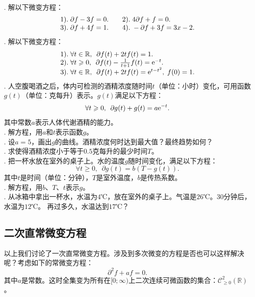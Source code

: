 \documentclass[12pt,UTF8,fontset=none]{ctexbook}
\begin{document}
\begin{xt}
    \mbox{} \\
    . 解以下微变方程：\\
    $$
    \begin{array}[]{ll}
        1).\;\partial f - 3 f = 0. &\quad2).\; 4\partial f + f = 0. \\
        3).\;\partial f + 4 f = 1. &\quad4).\; -\partial f + 3 f = 3x - 2. 
    \end{array}
    $$
    . 解以下微变方程：\\
    $$
    \begin{array}[]{l}
        1).\;\forall t\in \mathbb{R},\,\,\,\partial f(t) + 2 t f(t) = 1. \\
        2).\;\forall t \geqslant 0,\,\,\,\partial f(t) - \frac{1}{t + 1} f(t) = \e^{-t}. \\
        3).\;\forall t\in \mathbb{R},\,\,\,\partial f(t) + 2t f(t) =\e^{t - t^2}, \; f(0) = 1. 
    \end{array}
    $$
    . 人空腹喝酒之后，体内可检测的酒精浓度随时间$t$（单位：小时）变化，可用函数$g(t)$（单位：克每升）表示。$g(t)$满足以下方程：
    $$ \forall t\geqslant 0,\,\,\,\partial g(t) + g(t) = a \mathrm{e}^{-t}.$$
    其中常数$a$表示人体代谢酒精的能力。\\
    . 解方程，用$a$和$t$表示函数$g$。\\
    . 设$a = 5$，画出$g$的曲线。酒精浓度何时达到最大值？最终趋势如何？\\
    . 求使得酒精浓度小于等于$0.5$克每升的最少时间$T$。\\
    . 把一杯水放在室外的桌子上。水的温度$g$随时间变化，满足以下方程：
    $$ \forall t\geqslant 0,\,\,\,\partial g(t) = b(T - g(t)).$$
    其中$t$是时间（单位：分钟），$T$是室外温度，$b$是传热系数。\\
    . 解方程，用$b$、$T$、$t$表示$g$。\\
    . 从冰箱中拿出一杯水，水温为$4$℃，放在室外的桌子上。气温是$26$℃。$30$分钟后，水温为$12$℃。
    再过多久，水温达到$17$℃？
\end{xt}

\subsection{二次直常微变方程}
以上我们讨论了一次直常微变方程。涉及到多次微变的方程是否也可以这样解决呢？考虑如下的常微变方程：
\begin{equation}
    \partial^2 f + a f = 0. \label{2-2d}
\end{equation}
其中$a$是常数。这时全集变为所有在$[0;\infty)$上二次连续可微函数的集合：$\mathcal{C}^2_{\geqslant 0}(\mathbb{R})$。
\end{document}
